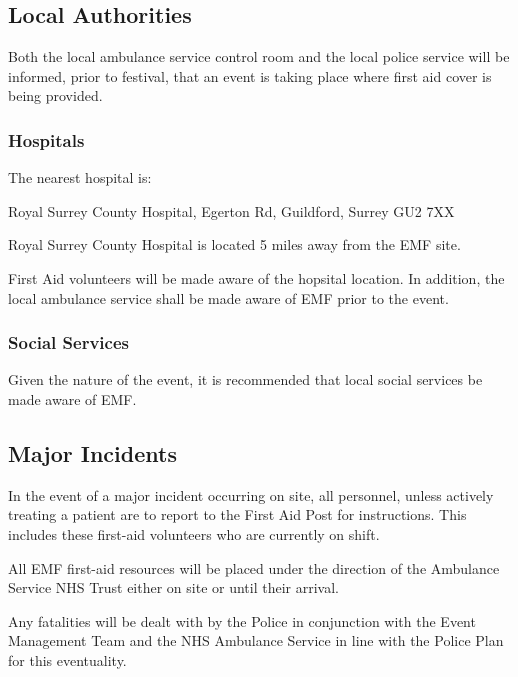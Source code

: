 \subsection{Local Authorities}
Both the local ambulance service control room and the local police service will
be informed, prior to festival, that an event is taking place where first aid
cover is being provided.

\subsubsection{Hospitals}

The nearest hospital is:

Royal Surrey County Hospital, Egerton Rd, Guildford, Surrey GU2 7XX

Royal Surrey County Hospital is located 5 miles away from the EMF site.

First Aid volunteers will be made aware of the hopsital location. In addition, the local ambulance service shall be made aware of EMF prior to the event.

\subsubsection{Social Services}

Given the nature of the event, it is recommended that local social services be made aware of EMF.

\subsection{Major Incidents}

In the event of a major incident occurring on site, all personnel, unless actively treating a patient are to report to the First Aid Post for instructions. This includes these first-aid volunteers who are currently on shift.

All EMF first-aid resources will be placed under the direction of the Ambulance Service NHS Trust either on site or until their arrival.

Any fatalities will be dealt with by the Police in conjunction with the Event Management Team and the NHS Ambulance Service in line with the Police Plan for this eventuality.
